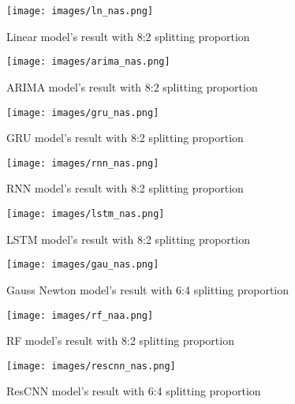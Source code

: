 \documentclass{ieeeojies}
\begin{document}
\begin{figure}[H]
  \centering
  \begin{minipage}{0.8\linewidth}
    \centering
    \texttt{[image: images/ln\_nas.png]}
    \caption{Linear model's result with 8:2 splitting proportion}
    \label{fig15}
  \end{minipage}
\end{figure}
\begin{figure}[H]
  \centering
  \begin{minipage}{0.8\linewidth}
    \centering
    \texttt{[image: images/arima\_nas.png]}
    \caption{ARIMA model's result with 8:2 splitting proportion}
    \label{fig16}
  \end{minipage}
\end{figure}
\begin{figure}[H]
  \centering
  \begin{minipage}{0.8\linewidth}
    \centering
    \texttt{[image: images/gru\_nas.png]}
    \caption{GRU model's result with 8:2 splitting proportion}
    \label{fig17}
  \end{minipage}
\end{figure}
\begin{figure}[H]
  \centering
  \begin{minipage}{0.8\linewidth}
    \centering
    \texttt{[image: images/rnn\_nas.png]}
    \caption{RNN model's result with 8:2 splitting proportion}
    \label{fig18}
  \end{minipage}
\end{figure}
\begin{figure}[H]
  \centering
  \begin{minipage}{0.8\linewidth}
    \centering
    \texttt{[image: images/lstm\_nas.png]}
    \caption{LSTM model's result with 8:2 splitting proportion}
    \label{fig19}
  \end{minipage}
\end{figure}
\begin{figure}[H]
  \centering
  \begin{minipage}{0.8\linewidth}
    \centering
    \texttt{[image: images/gau\_nas.png]}
    \caption{Gauss Newton model's result with 6:4 splitting proportion}
    \label{fig20}
  \end{minipage}
\end{figure}
\begin{figure}[H]
  \centering
  \begin{minipage}{0.8\linewidth}
    \centering
    \texttt{[image: images/rf\_naa.png]}
    \caption{RF model's result with 8:2 splitting proportion}
    \label{fig21}
  \end{minipage}
\end{figure}
\begin{figure}[H]
  \centering
  \begin{minipage}{0.8\linewidth}
    \centering
    \texttt{[image: images/rescnn\_nas.png]}
    \caption{ResCNN model's result with 6:4 splitting proportion}
    \label{mbbbggg}
  \end{minipage}
\end{figure}
\end{document}
